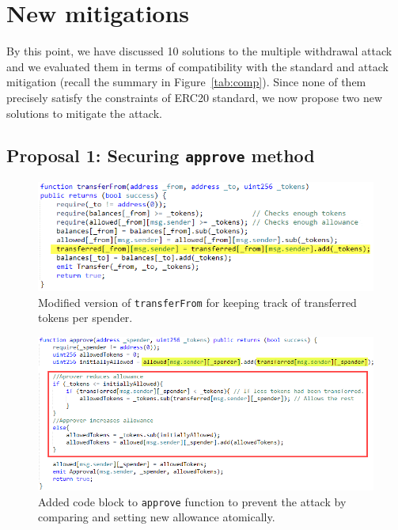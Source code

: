 
\section{New mitigations}

By this point, we have discussed 10 solutions to the multiple withdrawal attack and we evaluated them in terms of compatibility with the standard and attack mitigation (recall the summary in Figure~\ref{tab:comp}). Since none of them precisely satisfy the constraints of ERC20 standard, we now propose two new solutions to mitigate the attack.


\subsection{Proposal 1: Securing \texttt{approve} method}
\label{sec:proposal1}

\begin{figure}[t]
	\centering
	\includegraphics[width=1.0\linewidth]{figures/multiple_withdrawal_14.png}
	\caption{Modified version of \texttt{transferFrom} for keeping track of transferred tokens per spender.\label{fig:transfer1}}
\end{figure}


\begin{figure}[t]
	\centering
	\includegraphics[width=1.0\linewidth]{figures/multiple_withdrawal_15.png}
	\caption{Added code block to \texttt{approve} function to prevent the attack by comparing and setting new allowance atomically.\label{fig:approve1}}
\end{figure}

